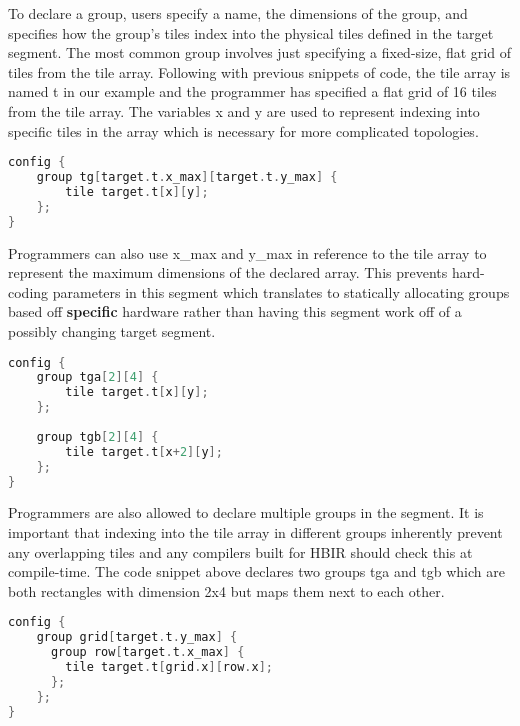 \documentclass{article}
\begin{document}
To declare a group, users specify a name, the dimensions of the group, and specifies how the group's tiles index into the physical tiles defined in the target segment. The most common group involves just specifying a fixed-size, flat grid of tiles from the tile array. Following with previous snippets of code, the tile array is named t in our example and the programmer has specified a flat grid of 16 tiles from the tile array. The variables x and y are used to represent indexing into specific tiles in the array which is necessary for more complicated topologies. \\

\begin{minipage}[c]{\textwidth}
\begin{lstlisting}[language=C, caption=Group with symbolic parameters]
config {
    group tg[target.t.x_max][target.t.y_max] {
        tile target.t[x][y];
    };
}
\end{lstlisting}
\end{minipage}

Programmers can also use x\_max and y\_max in reference to the tile array to represent the maximum dimensions of the declared array. This prevents hard-coding parameters in this segment which translates to statically allocating groups based off \textbf{specific} hardware rather than having this segment work off of a possibly changing target segment. \\

\begin{minipage}[c]{\textwidth}
\begin{lstlisting}[language=C, caption=Multiple groups]
config {
    group tga[2][4] {
        tile target.t[x][y];
    };
    
    group tgb[2][4] {
        tile target.t[x+2][y];
    };
}
\end{lstlisting}
\end{minipage}


Programmers are also allowed to declare multiple groups in the segment. It is important that indexing into the tile array in different groups inherently prevent any overlapping tiles and any compilers built for HBIR should check this at compile-time. The code snippet above declares two groups tga and tgb which are both rectangles with dimension 2x4 but maps them next to each other. \\

\begin{minipage}[c]{\textwidth}
\begin{lstlisting}[language=C, caption=Nested groups]
config {
    group grid[target.t.y_max] {
      group row[target.t.x_max] {
        tile target.t[grid.x][row.x];
      };
    };
}
\end{lstlisting}
\end{minipage}
\end{document}
